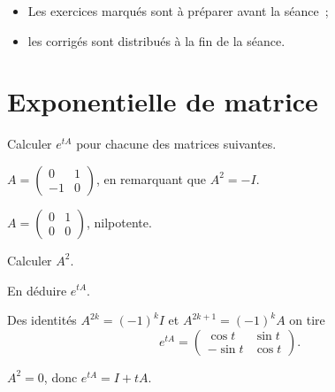 \begin{instructions}\breakline%
    \begin{itemize}
        \item Les exercices marqués \handwrite{} sont à préparer avant la séance~;
        \item les corrigés sont distribués à la fin de la séance.
    \end{itemize}
\end{instructions}

\medskip
\section{Exponentielle de matrice}


\begin{exercise}[label=ex:expo]
    Calculer $e^{tA}$ pour chacune des matrices suivantes.
    \begin{question}
        $A = \begin{pmatrix} 0 & 1 \\ -1 & 0 \end{pmatrix}$, en remarquant que
        $A^2 = -I$.
    \end{question}
    \begin{question}
        $A = \begin{pmatrix} 0 & 1 \\ 0 & 0 \end{pmatrix}$, nilpotente.
        \begin{subquestion}
            Calculer $A^2$.
        \end{subquestion}
        \begin{subquestion}
            En déduire $e^{tA}$.
        \end{subquestion}
    \end{question}
\solution
    \begin{question}
        Des identités $A^{2k} = (-1)^k I$ et $A^{2k+1} = (-1)^k A$ on tire
        \[
            e^{tA} = \begin{pmatrix} \cos t & \sin t \\ -\sin t & \cos t\end{pmatrix}.
        \]
    \end{question}
    \begin{question}
        $A^2 = 0$, donc $e^{tA} = I + tA$.
    \end{question}
\end{exercise}

